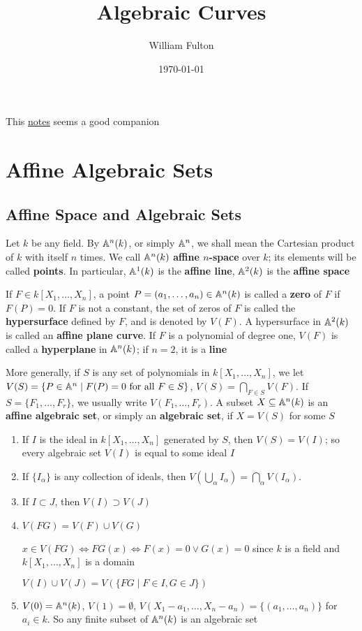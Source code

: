 \documentclass[11pt]{article}
\author{William Fulton}
\date{\today}
\title{Algebraic Curves}
\begin{document}
\maketitle
\tableofcontents

This \href{https://ziyuzhang.github.io/ma40188/Lecture\_Notes\_Long.pdf}{notes} seems a good companion
\section{Affine Algebraic Sets}
\label{sec:org91aa9c0}
\subsection{Affine Space and Algebraic Sets}
\label{sec:org2b0fd8c}
Let \(k\) be any field. By \(\mathbb{A}^n(k)\), or simply \(\mathbb{A}^n\), we shall mean the Cartesian product
of \(k\) with itself \(n\) times. We call \(\mathbb{A}^n(k)\) \textbf{affine \(n\)-space} over \(k\); its elements
will be called \textbf{points}. In particular, \(\mathbb{A}^1(k)\) is the \textbf{affine line}, \(\mathbb{A}^2(k)\) is the \textbf{affine
space}

If \(F\in k[X_1,\dots,X_n]\), a point \(P=(a_1,\dots,a_n)\in\mathbb{A}^n(k)\) is called a \textbf{zero} of \(F\) if \(F(P)=0\).
If \(F\) is not a constant, the set of zeros of \(F\) is called the \textbf{hypersurface} defined
by \(F\), and is denoted by \(V(F)\). A hypersurface in \(\mathbb{A}^2(k)\) is called an \textbf{affine plane
curve}. If \(F\) is a polynomial of degree one, \(V(F)\) is called a \textbf{hyperplane} in \(\mathbb{A}^n(k)\);
if \(n=2\), it is a \textbf{line}

More generally, if \(S\) is any set of polynomials in \(k[X_1,\dots,X_n]\), we
let \(V(S)=\{P\in\mathbb{A}^n\mid F(P)=0\text{ for all }F\in S\}\), \(V(S)=\bigcap_{F\in S}V(F)\). If \(S=\{F_1,\dots,F_r\}\), we
usually write \(V(F_1,\dots,F_r)\). A subset \(X\subseteq\mathbb{A}^n(k)\) is an \textbf{affine algebraic set}, or simply an
\textbf{algebraic set}, if \(X=V(S)\) for some \(S\)

\begin{enumerate}
\item If \(I\) is the ideal in \(k[X_1,\dots,X_n]\) generated by \(S\), then \(V(S)=V(I)\); so every
algebraic set \(V(I)\) is equal to some ideal \(I\)
\item If \(\{I_\alpha\}\) is any collection of ideals, then \(V(\bigcup_\alpha I_\alpha)=\bigcap_\alpha V(I_\alpha)\).
\item If \(I\subset J\), then \(V(I)\supset V(J)\)
\item \(V(FG)=V(F)\cup V(G)\)

\(x\in V(FG)\Leftrightarrow FG(x)\Leftrightarrow F(x)=0\vee G(x)=0\) since \(k\) is a field and \(k[X_1,\dots,X_n]\) is a domain

\(V(I)\cup V(J)=V(\{FG\mid F\in I,G\in J\})\)
\item \(V(0)=\mathbb{A}^n(k)\), \(V(1)=\emptyset\), \(V(X_1-a_1,\dots,X_n-a_n)=\{(a_1,\dots,a_n)\}\) for \(a_i\in k\). So any finite
subset of \(\mathbb{A}^n(k)\) is an algebraic set
\end{enumerate}
\end{document}
